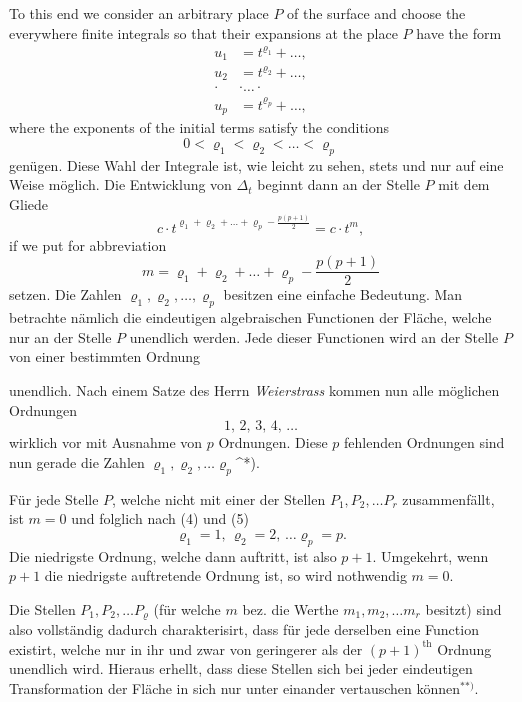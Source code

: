 \documentclass{article}
\begin{document}
To this end we consider an arbitrary place $P$ of the surface and choose the everywhere finite integrals so that their expansions at the place $P$ have the form
\[
\begin{aligned}
u_1 &= t^{\varrho_1} + \dots, \\
u_2 &= t^{\varrho_2} + \dots, \\
\cdot & \cdot \dots \cdot \\
u_p &= t^{\varrho_p} + \dots,
\end{aligned}
\]
where the exponents of the initial terms satisfy the conditions
\[
0 < \varrho_1 < \varrho_2 < \dots < \varrho_p
\tag{4}
\]
genügen. Diese Wahl der Integrale ist, wie leicht zu sehen, stets und nur auf eine Weise möglich. Die Entwicklung von $\Delta_t$ beginnt dann an der Stelle $P$ mit dem Gliede
\[
c \cdot t^{\varrho_1 + \varrho_2 + \dots + \varrho_p - \frac{p(p+1)}{2}} = c \cdot t^m,
\]
if we put for abbreviation
\[
m = \varrho_1 + \varrho_2 + \dots + \varrho_p - \frac{p(p+1)}{2}
\tag{5}
\]
setzen. Die Zahlen $\varrho_1, \varrho_2, \dots, \varrho_p$ besitzen eine einfache Bedeutung. Man betrachte nämlich die eindeutigen algebraischen Functionen der Fläche, welche nur an der Stelle $P$ unendlich werden. Jede dieser Functionen wird an der Stelle $P$ von einer bestimmten Ordnung

unendlich. Nach einem Satze des Herrn \emph{Weierstrass} kommen nun alle möglichen Ordnungen
\[
1,\, 2,\, 3,\, 4,\, \dots
\]
wirklich vor mit Ausnahme von $p$ Ordnungen. Diese $p$ fehlenden Ordnungen sind nun gerade die Zahlen $\varrho_1, \varrho_2, \dots \varrho_p${}^{*)}.

Für jede Stelle $P$, welche nicht mit einer der Stellen $P_1, P_2, \dots P_r$ zusammenfällt, ist $m = 0$ und folglich nach (4) und (5)
\[
\varrho_1 = 1,\, \varrho_2 = 2,\, \dots \varrho_p = p.
\]
Die niedrigste Ordnung, welche dann auftritt, ist also $p+1$. Umgekehrt, wenn $p+1$ die niedrigste auftretende Ordnung ist, so wird nothwendig $m = 0$.

Die Stellen $P_1, P_2, \dots P_\varrho$ (für welche $m$ bez. die Werthe $m_1, m_2, \dots m_r$ besitzt) sind also vollständig dadurch charakterisirt, dass für jede derselben eine Function existirt, welche nur in ihr und zwar von geringerer als der $(p+1)^{\text{th}}$ Ordnung unendlich wird. Hieraus erhellt, dass diese Stellen sich bei jeder eindeutigen Transformation der Fläche in sich nur unter einander vertauschen können${}^{**)}$.
\end{document}
